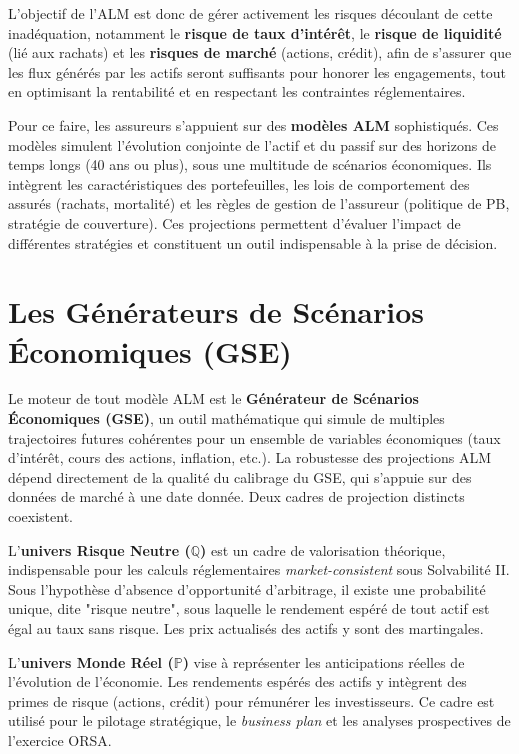 L'objectif de l'ALM est donc de gérer activement les risques découlant de cette inadéquation, notamment le \textbf{risque de taux d'intérêt}, le \textbf{risque de liquidité} (lié aux rachats) et les \textbf{risques de marché} (actions, crédit), afin de s'assurer que les flux générés par les actifs seront suffisants pour honorer les engagements, tout en optimisant la rentabilité et en respectant les contraintes réglementaires.

\bigskip

Pour ce faire, les assureurs s'appuient sur des \textbf{modèles ALM} sophistiqués. Ces modèles simulent l'évolution conjointe de l'actif et du passif sur des horizons de temps longs (40 ans ou plus), sous une multitude de scénarios économiques. Ils intègrent les caractéristiques des portefeuilles, les lois de comportement des assurés (rachats, mortalité) et les règles de gestion de l'assureur (politique de PB, stratégie de couverture). Ces projections permettent d'évaluer l'impact de différentes stratégies et constituent un outil indispensable à la prise de décision.

\section{Les Générateurs de Scénarios Économiques (GSE)}
\label{sec:gse}

Le moteur de tout modèle ALM est le \textbf{Générateur de Scénarios Économiques (GSE)}, un outil mathématique qui simule de multiples trajectoires futures cohérentes pour un ensemble de variables économiques (taux d'intérêt, cours des actions, inflation, etc.). La robustesse des projections ALM dépend directement de la qualité du calibrage du GSE, qui s'appuie sur des données de marché à une date donnée. Deux cadres de projection distincts coexistent.

\bigskip

L'\textbf{univers Risque Neutre ($\mathbb{Q}$)} est un cadre de valorisation théorique, indispensable pour les calculs réglementaires \textit{market-consistent} sous Solvabilité II. Sous l'hypothèse d'absence d'opportunité d'arbitrage, il existe une probabilité unique, dite "risque neutre", sous laquelle le rendement espéré de tout actif est égal au taux sans risque. Les prix actualisés des actifs y sont des martingales.

\bigskip

L'\textbf{univers Monde Réel ($\mathbb{P}$)} vise à représenter les anticipations réelles de l'évolution de l'économie. Les rendements espérés des actifs y intègrent des primes de risque (actions, crédit) pour rémunérer les investisseurs. Ce cadre est utilisé pour le pilotage stratégique, le \textit{business plan} et les analyses prospectives de l'exercice ORSA.


